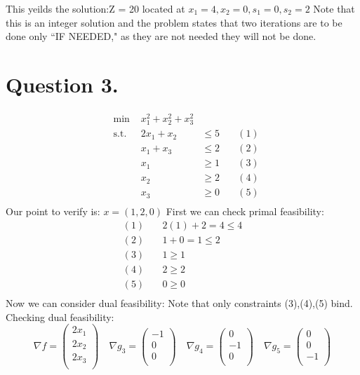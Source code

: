 \documentclass[10pt, letterpaper]{paper}
\begin{document}
This yeilds the solution:Z = 20 located at $x_1 = 4, x_2 = 0, s_1 = 0, s_2 = 2$ Note that this is an integer solution and the problem states that two iterations are to be done only ``IF NEEDED," as they are not needed they will not be done.

\section*{Question 3.}
\begin{equation*}
\begin{alignedat}{4}
&\text{min }&x_1^2 +x_2^2 + x_3^2&\\
&\text{s.t. } &2x_1 +x_2 &\leq 5 \quad &(1)\\
& &x_1 + x_3 &\leq 2 \quad &(2)\\
& &x_1 &\geq 1 \quad &(3)\\
& &x_2 &\geq 2 \quad &(4)\\
& &x_3 &\geq 0 \quad &(5)\\
\end{alignedat}
\end{equation*}
Our point to verify is: $x = (1,2,0)$
First we can check primal feasibility:
\begin{align*}
(1) \quad& 2(1)+2 = 4 \leq 4\\
(2) \quad& 1 + 0 = 1 \leq 2\\
(3) \quad& 1 \geq 1\\
(4) \quad& 2 \geq 2\\
(5) \quad& 0 \geq 0\\
\end{align*}
Now we can consider dual feasibility: Note that only constraints (3),(4),(5) bind.
\newline
Checking dual feasibility:
\[ \nabla f = \left ( {\begin{array}{c}
	2x_1\\
	2x_2\\
	2x_3\\
	\end{array} } \right ) \quad \nabla g_3 = \left ( {\begin{array}{c}
	-1\\
	0\\
	0\\
	\end{array} } \right ) \quad \nabla g_4 = \left ( {\begin{array}{c}
	0\\
	-1\\
	0\\
	\end{array} } \right ) \quad \nabla g_5 = \left ( {\begin{array}{c}
	0\\
	0\\
	-1\\
	\end{array} } \right ) \]
\end{document}
